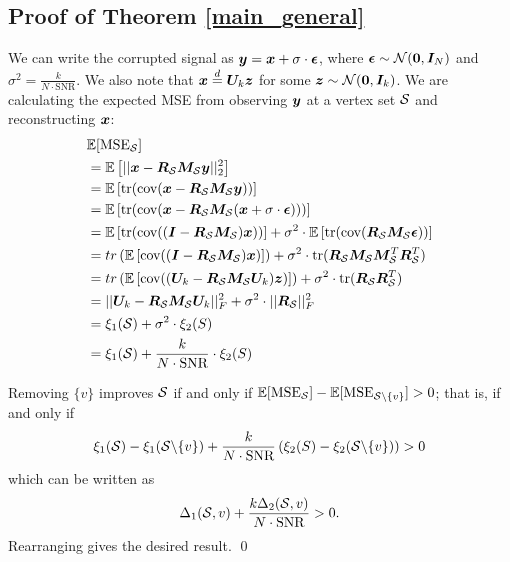 \subsection{Proof of Theorem \ref{main_general}}
\label{proof_appendix_thm}
We can write the corrupted signal as $\bm{y} = \bm{x} + \sigma \cdot \bm{\epsilon}$, where $\bm{\epsilon} \sim \mathcal{N}(\bm{0}, \bm{I}_{N})$ and $\sigma^2 = \frac{k}{N \cdot \text{SNR}}$. We also note that $\bm{x} \overset{d}{=} \bm{U}_{k} \bm{z}$ for some $\bm{z} \sim \mathcal{N}(\bm{0}, \bm{I}_{k})$. We are calculating the expected MSE from observing $\bm{y}$ at a vertex set $\mathcal{S}$ and reconstructing $\bm{x}$:
\begin{align}
    &\mathbb{E}[\text{MSE}_{\mathcal{S}}] \\
    &= \mathbb{E}\left[ || \bm{x} - \bm{R}_{\mathcal{S}} \bm{M}_{\mathcal{S}} \bm{y} ||^{2}_{2} \right] \\
    &= \mathbb{E}\left[ \text{tr}(\text{cov}(\bm{x} - \bm{R}_{\mathcal{S}} \bm{M}_{\mathcal{S}} \bm{y})) \right] \\
        &= \mathbb{E}\left[ \text{tr}(\text{cov}(\bm{x} - \bm{R}_{\mathcal{S}} \bm{M}_{\mathcal{S}} (\bm{x} + \sigma \cdot \bm{\epsilon}))) \right] \\
    &= \mathbb{E}\left[ \text{tr}( \text{cov}( (\bm{I} - \bm{R}_{\mathcal{S}} \bm{M}_{\mathcal{S}}) \bm{x} ) ) \right] 
    + \sigma^{2} \cdot \mathbb{E}\left[ \text{tr}( \text{cov}( \bm{R}_{\mathcal{S}} \bm{M}_{\mathcal{S}} \bm{\epsilon} ) ) \right] \\
    &= tr\left( \mathbb{E} \left[ \text{cov}( (\bm{I} - \bm{R}_{\mathcal{S}} \bm{M}_{\mathcal{S}}) \bm{x} ) \right] \right)
    + \sigma^{2} \cdot \text{tr}(\bm{R}_{\mathcal{S}} \bm{M}_{\mathcal{S}} \bm{M}_{\mathcal{S}}^{T} \bm{R}_{\mathcal{S}}^{T}) \\
    &= tr\left( \mathbb{E} \left[ \text{cov}( (\bm{U}_{k} - \bm{R}_{\mathcal{S}} \bm{M}_{\mathcal{S}}\bm{U}_{k}) \bm{z} ) \right] \right)
    + \sigma^{2} \cdot \text{tr}(\bm{R}_{\mathcal{S}} \bm{R}_{\mathcal{S}}^{T}) \\
    &= || \bm{U}_{k} - \bm{R}_{\mathcal{S}}\bm{M}_{\mathcal{S}}\bm{U}_{k} ||^{2}_{F} + \sigma^2 \cdot || \bm{R}_{\mathcal{S}} ||^{2}_{F} \\ 
    &= \xi_{1}(\mathcal{S}) + \sigma^{2} \cdot \xi_{2}(S) \\
    &= \xi_{1}(\mathcal{S}) + \frac{k}{N \cdot \text{SNR}} \cdot \xi_{2}(S)
\end{align}

\noindent Removing $\{v\}$ improves $\mathcal{S}$ if and only if $\mathbb{E}[\text{MSE}_{\mathcal{S}}] - \mathbb{E}[\text{MSE}_{\mathcal{S} \backslash \{v\}}] > 0$; that is, if and only if
\[
    \xi_{1}(\mathcal{S}) - \xi_{1}(\mathcal{S} \backslash \{v\}) + \frac{k}{N \cdot \text{SNR}} \left( \xi_{2}(S) - \xi_{2}(\mathcal{S} \backslash \{v\}) \right) > 0 
    \] which can be written as
    \[\Delta_{1}(\mathcal{S},v) + \frac{k \Delta_{2}(\mathcal{S},v)}{N \cdot \text{SNR}} > 0.
    \]
Rearranging gives the desired result. \qed


